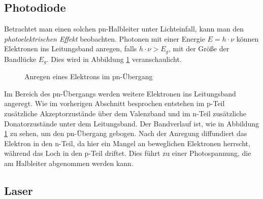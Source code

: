 \clearpage

    \subsection{Photodiode}

Betrachtet man einen solchen pn-Halbleiter unter Lichteinfall, kann man den 
\emph{photoelektrischen Effekt} beobachten. Photonen mit einer Energie 
$E= h \cdot \nu$ können Elektronen ins Leitungsband anregen,
falls $h \cdot \nu > E_g$, mit der Größe der Bandlücke $E_g$.
Dies wird in Abbildung \ref{abb:photo} veranschaulicht.
\begin{figure}[h]
  \centering
  
  \caption{Anregen eines Elektrons im pn-Übergang}
  \label{abb:photo}
\end{figure}
Im Bereich des pn-Übergangs werden weitere Elektronen ins Leitungsband angeregt.
Wie im vorherigen Abschnitt besprochen entstehen im p-Teil zusätzliche 
Akzeptorzustände über dem Valenzband und im n-Teil zusätzliche Donatorzustände
unter dem Leitungsband. Der Bandverlauf ist, wie in Abbildung \ref{abb:photo} 
zu sehen, um den pn-Übergang gebogen. Nach der Anregung diffundiert das Elektron
in den n-Teil, da hier ein Mangel an beweglichen Elektronen herrscht, während das
Loch in den p-Teil driftet. Dies führt zu einer Photospannung, die am Halbleiter
abgenommen werden kann.


    \subsection{Laser}

